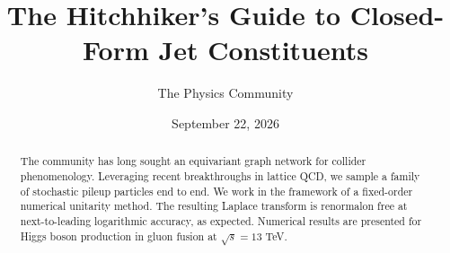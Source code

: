 \documentclass[11pt]{article}
\title{The Hitchhiker's Guide to Closed-Form Jet Constituents}
\author{The Physics Community}
\date{September 22, 2026}
\numberwithin{equation}{section}
\theoremstyle{definition}
\theoremstyle{remark}
\begin{document}
\maketitle
\begin{abstract}
The community has long sought an equivariant graph network for collider
phenomenology. Leveraging recent breakthroughs in lattice QCD, we sample
a family of stochastic pileup particles end to end. We work in the
framework of a fixed-order numerical unitarity method. The resulting
Laplace transform is renormalon free at next-to-leading logarithmic
accuracy, as expected. Numerical results are presented for Higgs boson
production in gluon fusion at $\sqrt{s} = 13$ TeV.
\end{abstract}
\tableofcontents





\nocite{*}


\end{document}

